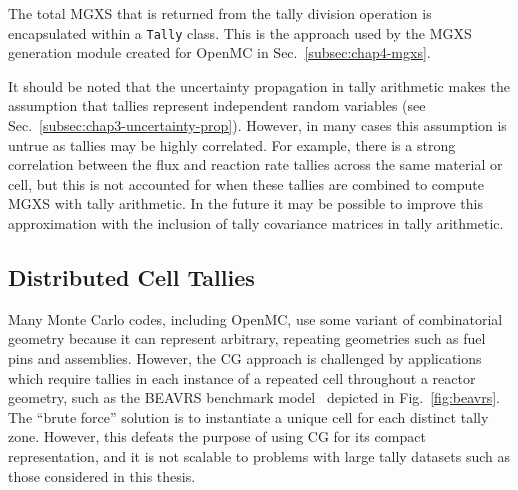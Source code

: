 \noindent The total \ac{MGXS} that is returned from the tally division operation is encapsulated within a \texttt{Tally} class. This is the approach used by the \ac{MGXS} generation module created for OpenMC in Sec.~\ref{subsec:chap4-mgxs}.

It should be noted that the uncertainty propagation in tally arithmetic makes the assumption that tallies represent independent random variables (see Sec.~\ref{subsec:chap3-uncertainty-prop}). However, in many cases this assumption is untrue as tallies may be highly correlated. For example, there is a strong correlation between the flux and reaction rate tallies across the same material or cell, but this is not accounted for when these tallies are combined to compute \ac{MGXS} with tally arithmetic. In the future it may be possible to improve this approximation with the inclusion of tally covariance matrices in tally arithmetic.

\subsection{Distributed Cell Tallies}
\label{subsec:chap4-distribcells}

Many Monte Carlo codes, including OpenMC, use some variant of combinatorial geometry because it can represent arbitrary, repeating geometries such as fuel pins and assemblies. However, the \ac{CG} approach is challenged by applications which require tallies in each instance of a repeated cell throughout a reactor geometry, such as the \ac{BEAVRS} benchmark model~\cite{horelik2013beavrs} depicted in Fig.~\ref{fig:beavrs}. The ``brute force'' solution is to instantiate a unique cell for each distinct tally zone. However, this defeats the purpose of using \ac{CG} for its compact representation, and it is not scalable to problems with large tally datasets such as those considered in this thesis.

